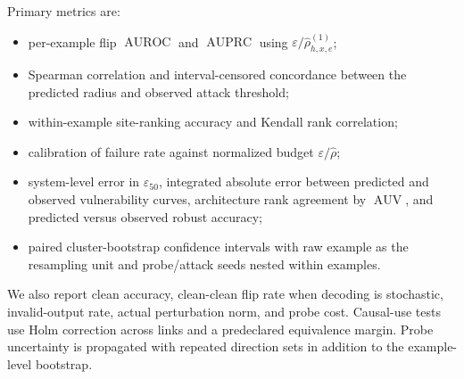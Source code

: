 \documentclass[11pt]{article}
\DeclareMathOperator{\AUPRC}{AUPRC}
\DeclareMathOperator{\AUROC}{AUROC}
\DeclareMathOperator{\AUV}{AUV}
\newcommand{\eps}{\varepsilon}
\begin{document}
Primary metrics are:
\begin{itemize}
    \item per-example flip $\AUROC$ and $\AUPRC$ using
    $\eps/\widehat\rho_{h,x,e}^{(1)}$;
    \item Spearman correlation and interval-censored concordance between the
    predicted radius and observed attack threshold;
    \item within-example site-ranking accuracy and Kendall rank correlation;
    \item calibration of failure rate against normalized budget
    $\eps/\widehat\rho$;
    \item system-level error in \(\eps_{50}\), integrated absolute error between
    predicted and observed vulnerability curves, architecture rank agreement
    by \(\AUV\), and predicted versus observed robust accuracy;
    \item paired cluster-bootstrap confidence intervals with raw example as the
    resampling unit and probe/attack seeds nested within examples.
\end{itemize}
We also report clean accuracy, clean-clean flip rate when decoding is stochastic,
invalid-output rate, actual perturbation norm, and probe cost. Causal-use tests
use Holm correction across links and a predeclared equivalence margin. Probe
uncertainty is propagated with repeated direction sets in addition to the
example-level bootstrap.
\end{document}
